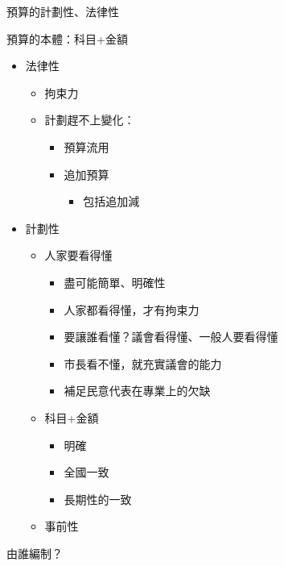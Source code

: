 \documentclass[
]{book}
\providecommand{\tightlist}{%
  \setlength{\itemsep}{0pt}\setlength{\parskip}{0pt}}
\begin{document}
預算的計劃性、法律性

預算的本體：科目+金額

\begin{itemize}
\tightlist
\item
  法律性

  \begin{itemize}
  \tightlist
  \item
    拘束力
  \item
    計劃趕不上變化：

    \begin{itemize}
    \tightlist
    \item
      預算流用
    \item
      追加預算

      \begin{itemize}
      \tightlist
      \item
        包括追加減
      \end{itemize}
    \end{itemize}
  \end{itemize}
\item
  計劃性

  \begin{itemize}
  \tightlist
  \item
    人家要看得懂

    \begin{itemize}
    \tightlist
    \item
      盡可能簡單、明確性
    \item
      人家都看得懂，才有拘束力
    \item
      要讓誰看懂？議會看得懂、一般人要看得懂
    \item
      市長看不懂，就充實議會的能力
    \item
      補足民意代表在專業上的欠缺
    \end{itemize}
  \item
    科目+金額

    \begin{itemize}
    \tightlist
    \item
      明確
    \item
      全國一致
    \item
      長期性的一致
    \end{itemize}
  \item
    事前性
  \end{itemize}
\end{itemize}

由誰編制？
\end{document}
